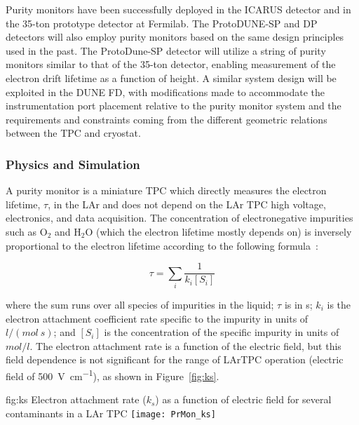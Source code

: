 Purity monitors have been successfully deployed in the ICARUS detector and in the 35-ton prototype detector at Fermilab. The ProtoDUNE-SP and DP detectors will also employ purity monitors based on the same design principles used in the past. The ProtoDune-SP detector will utilize a string of purity monitors similar to that of the 35-ton detector, enabling measurement of the electron drift lifetime as a function of height.  A similar system design will be exploited in the DUNE FD, with modifications made to accommodate the instrumentation port placement relative to the purity monitor system and the requirements and constraints coming from the different geometric relations between the TPC and cryostat. 

\subsubsection{Physics and Simulation}
A purity monitor is a miniature TPC which directly measures the electron lifetime, $\tau$, in the LAr and does not depend on the LAr TPC high voltage, electronics, and data acquisition. The concentration of electronegative impurities such as $\text{O}_2$ and $\text{H}_2\text{O}$ (which the electron lifetime mostly depends on) is inversely proportional to the electron lifetime according to the following formula~\cite{BakaleSowadaSchmidt}:

$$\tau = \sum_i \frac{1}{k_i [S_i]}$$

where the sum runs over all species of impurities in the liquid; $\tau$ is in s; $k_i$ is the electron attachment coefficient rate specific to the impurity in units of $l/(mol~s)$; and $[S_i]$ is the concentration of the specific impurity in units of $mol/l$. The electron attachment rate is a function of the electric field, but this field dependence is not significant for the range of LArTPC operation (electric field of \SI{500}{\volt\per\centi\meter}), as shown in Figure~\ref{fig:ks}. 

\begin{dunefigure}{fig:ks}
  {Electron attachment rate ($k_s$) as a function of electric field for several contaminants in a LAr TPC\cite{docdb-4482}}
  \texttt{[image: PrMon\_ks]}%
\end{dunefigure}

